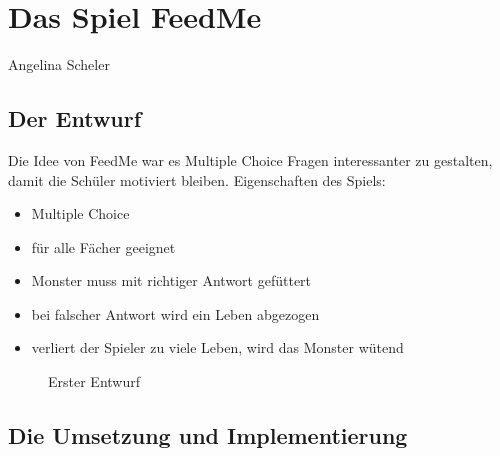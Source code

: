 \chapter{Das Spiel FeedMe}
Angelina Scheler

\section{Der Entwurf}

Die Idee von FeedMe war es Multiple Choice Fragen interessanter zu gestalten, damit die Schüler motiviert bleiben. Eigenschaften des Spiels:

\begin{itemize}
\item Multiple Choice
\item für alle Fächer geeignet
\item Monster muss mit richtiger Antwort gefüttert
\item bei falscher Antwort wird ein Leben abgezogen
\item verliert der Spieler zu viele Leben, wird das Monster wütend
\end{itemize}

\begin{figure}[H]
	\centering
	\caption{Erster Entwurf}
	\label{Erster Entwurf}
\end{figure}



\section{Die Umsetzung und Implementierung}

